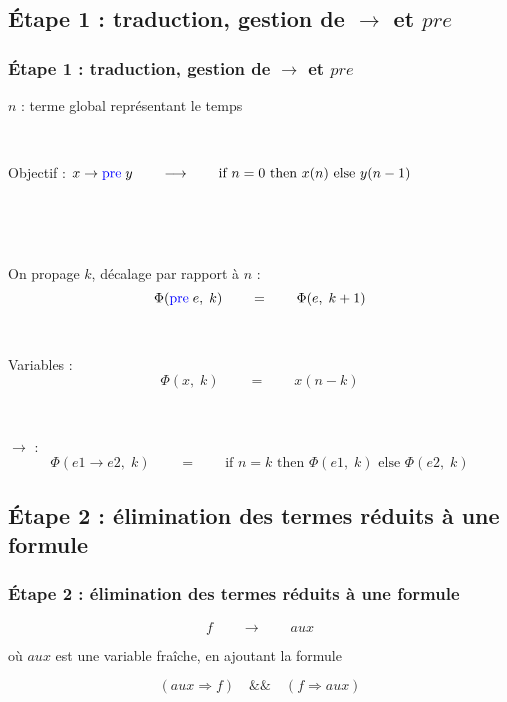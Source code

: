 \documentclass[18pt]{beamer}
\begin{document}
\subsection{Étape 1 : traduction, gestion de $\rightarrow$ et $pre$}
\begin{frame}
\frametitle{Étape 1 : traduction, gestion de $\rightarrow$ et $pre$}
	
	$n$ : terme global représentant le temps
	
	\
	
	Objectif : \qquad $x\rightarrow \textcolor{blue}{\text{pre}} \; y \qquad\longrightarrow\qquad \text{if }n=0 \text{ then } x(n) \text{ else } y(n-1)$
	
	\
	
	\
	
	On propage $k$, décalage par rapport à $n$ :
	\vspace{-1em}
	$$\Phi(\textcolor{blue}{\text{pre}} \;e,\;k) \qquad=\qquad \Phi(e,\;k+1)$$
	
	\
	
	Variables :
	\vspace{-1em}
	$$\Phi(x,\;k) \qquad=\qquad x(n-k)$$
	
	\
	
	$\rightarrow$ :
	\vspace{-1em}
	$$\Phi(e1\rightarrow e2, \;k) \qquad=\qquad \text{if }n=k \text{ then } \Phi(e1,\;k) \text{ else } \Phi(e2,\;k)$$
	
\end{frame}


\subsection{Étape 2 :
élimination des termes réduits à une formule}
\begin{frame}
\frametitle{Étape 2 :
élimination des termes réduits à une formule}
	
	$$f \qquad\longrightarrow\qquad aux$$

	où $aux$ est une variable fraîche, en ajoutant la formule
	
	$$(aux \Rightarrow f) \quad \&\& \quad (f \Rightarrow aux)$$
	
	
\end{frame}
\end{document}
